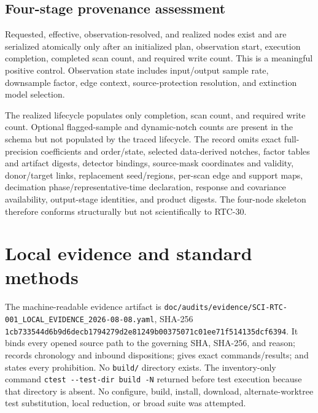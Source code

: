 \documentclass[11pt]{article}
\newcommand{\code}[1]{\nolinkurl{#1}}
\begin{document}
\subsection{Four-stage provenance assessment}

Requested, effective, observation-resolved, and realized nodes exist and are
serialized atomically only after an initialized plan, observation start,
execution completion, completed scan count, and required write count.  This is
a meaningful positive control.  Observation state includes input/output sample
rate, downsample factor, edge context, source-protection resolution, and
extinction model selection.

The realized lifecycle populates only completion, scan count, and required
write count.  Optional flagged-sample and dynamic-notch counts are present in
the schema but not populated by the traced lifecycle.  The record omits exact
full-precision coefficients and order/state, selected data-derived notches,
factor tables and artifact digests, detector bindings, source-mask coordinates
and validity, donor/target links, replacement seed/regions, per-scan edge and
support maps, decimation phase/representative-time declaration, response and
covariance availability, output-stage identities, and product digests.  The
four-node skeleton therefore conforms structurally but not scientifically to
RTC-30.

\section{Local evidence and standard methods}

The machine-readable evidence artifact is
\code{doc/audits/evidence/SCI-RTC-001_LOCAL_EVIDENCE_2026-08-08.yaml}, SHA-256
\code{1cb733544d6b9d6decb1794279d2e81249b00375071c01ee71f514135dcf6394}.
It binds every opened source path to the governing SHA, SHA-256, and reason;
records chronology and inbound dispositions; gives exact commands/results;
and states every prohibition.  No \code{build/} directory exists.  The
inventory-only command \code{ctest --test-dir build -N} returned before test
execution because that directory is absent.  No configure, build, install,
download, alternate-worktree test substitution, local reduction, or broad
suite was attempted.
\end{document}
